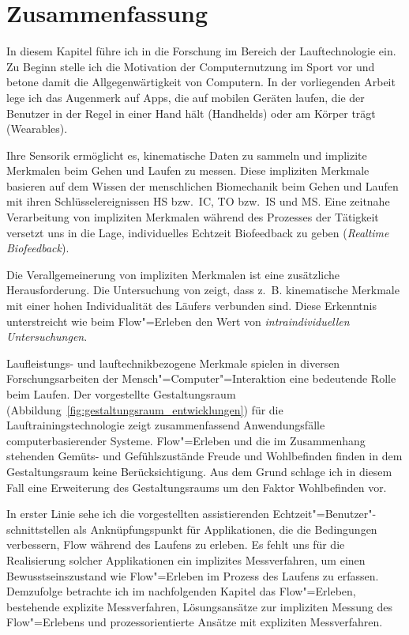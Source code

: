 

\section{Zusammenfassung} 

\label{sec:zusammenfassung_2}

In diesem Kapitel führe ich in die Forschung im Bereich der Lauftechnologie ein. Zu Beginn stelle ich die Motivation der Computernutzung im Sport vor und betone damit die Allgegenwärtigkeit von Computern. In der vorliegenden Arbeit lege ich das Augenmerk auf Apps, die auf mobilen Geräten laufen, die der Benutzer in der Regel in einer Hand hält (Handhelds) oder am Körper trägt (Wearables).

Ihre Sensorik ermöglicht es, kinematische Daten zu sammeln und implizite Merkmalen beim Gehen und Laufen zu messen. Diese impliziten Merkmale basieren auf dem Wissen der menschlichen Biomechanik beim Gehen und Laufen mit ihren Schlüsselereignissen \ac{HS} bzw.\ \ac{IC}, \ac{TO} bzw.\ \ac{IS} und \ac{MS}. Eine zeitnahe Verarbeitung von impliziten Merkmalen während des Prozesses der Tätigkeit versetzt uns in die Lage, individuelles Echtzeit Biofeedback zu geben (\emph{Realtime Biofeedback}). 

Die Verallgemeinerung von impliziten Merkmalen ist eine zusätzliche Herausforderung. Die Untersuchung von \citet{Strohrmann2012} zeigt, dass z.~B. kinematische Merkmale mit einer hohen Individualität des Läufers verbunden sind. Diese Erkenntnis unterstreicht wie beim Flow"=Erleben den Wert von \emph{intraindividuellen Untersuchungen}.

Laufleistungs- und lauftechnikbezogene Merkmale spielen in diversen Forschungsarbeiten der Mensch"=Computer"=Interaktion eine bedeutende Rolle beim Laufen. Der vorgestellte Gestaltungsraum (Abbildung~\ref{fig:gestaltungsraum_entwicklungen}) für die Lauftrainingstechnologie zeigt zusammenfassend Anwendungsfälle computerbasierender Systeme. Flow"=Erleben und die im Zusammenhang stehenden Gemüts- und Gefühlszustände Freude und Wohlbefinden finden in dem Gestaltungsraum keine Berücksichtigung. Aus dem Grund schlage ich in diesem Fall eine Erweiterung des Gestaltungsraums um den Faktor Wohlbefinden vor.

In erster Linie sehe ich die vorgestellten assistierenden Echtzeit"=Benutzer"-schnittstellen als Anknüpfungspunkt für Applikationen, die die Bedingungen verbessern, Flow während des Laufens zu erleben. Es fehlt uns für die Realisierung solcher Applikationen ein implizites Messverfahren, um einen Bewusstseinszustand wie Flow"=Erleben im Prozess des Laufens zu erfassen. Demzufolge betrachte ich im nachfolgenden Kapitel das Flow"=Erleben, bestehende explizite Messverfahren, Lösungsansätze zur impliziten Messung des Flow"=Erlebens und prozessorientierte Ansätze mit expliziten Messverfahren.

